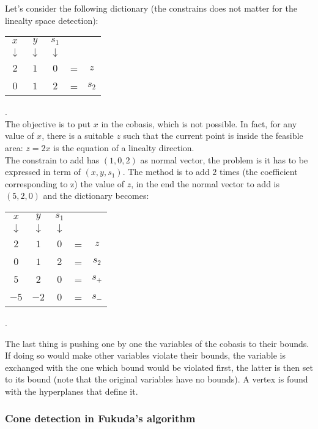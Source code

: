 \begin{example}
	Let's consider the following dictionary (the constrains does not matter for the linealty space detection):
	\begin{tabular}{| c | c | c | c  c |}
	\hline	
	$x$ & $y$ & $s_1$ & & \\
	$\downarrow$ & $\downarrow$ & $\downarrow$ & & \\
	\hline
	\hline	
   	$2$ & $1$ & $0$ & = & $z$ \\ \hline	
   	$0$ & $1$ & $2$ & = & $s_2$\\ \hline 
 	\end{tabular}.\\
 	The objective is to put $x$ in the cobasis, which is not possible. In fact, for any value of $x$, there is a suitable $z$ such that the current point is inside the feasible area: $z=2x$ is the equation of a linealty direction.\\
 	The constrain to add has $(1,0,2)$ as normal vector, the problem is it has to be expressed in term of $(x,y,s_1)$. The method is to add $2$ times (the coefficient corresponding to z) the value of $z$, in the end the normal vector to add is $(5,2,0)$ and the dictionary becomes:
 	\begin{tabular}{| c | c | c | c  c |}
	\hline	
	$x$ & $y$ & $s_1$ & & \\
	$\downarrow$ & $\downarrow$ & $\downarrow$ & & \\
	\hline
	\hline	
   	$2$ & $1$ & $0$ & = & $z$ \\ \hline	
   	$0$ & $1$ & $2$ & = & $s_2$\\ \hline 
   	$5$ & $2$ & $0$ & = & $s_+$\\ \hline 
   	$-5$ & $-2$ & $0$ & = & $s_-$\\ \hline 
 	\end{tabular}.
 	\label{ex_detect_linalty}
\end{example}

The last thing is pushing one by one the variables of the cobasis to their bounds. If doing so would make other variables violate their bounds, the variable is exchanged with the one which bound would be violated first, the latter is then set to its bound (note that the original variables have no bounds). A vertex is found with the hyperplanes that define it.


\subsubsection{Cone detection in Fukuda's algorithm}


